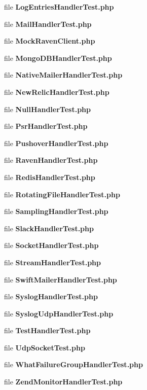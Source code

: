 \begin{DoxyCompactItemize}
file {\bf Log\+Entries\+Handler\+Test.\+php}
\item 
file {\bf Mail\+Handler\+Test.\+php}
\item 
file {\bf Mock\+Raven\+Client.\+php}
\item 
file {\bf Mongo\+D\+B\+Handler\+Test.\+php}
\item 
file {\bf Native\+Mailer\+Handler\+Test.\+php}
\item 
file {\bf New\+Relic\+Handler\+Test.\+php}
\item 
file {\bf Null\+Handler\+Test.\+php}
\item 
file {\bf Psr\+Handler\+Test.\+php}
\item 
file {\bf Pushover\+Handler\+Test.\+php}
\item 
file {\bf Raven\+Handler\+Test.\+php}
\item 
file {\bf Redis\+Handler\+Test.\+php}
\item 
file {\bf Rotating\+File\+Handler\+Test.\+php}
\item 
file {\bf Sampling\+Handler\+Test.\+php}
\item 
file {\bf Slack\+Handler\+Test.\+php}
\item 
file {\bf Socket\+Handler\+Test.\+php}
\item 
file {\bf Stream\+Handler\+Test.\+php}
\item 
file {\bf Swift\+Mailer\+Handler\+Test.\+php}
\item 
file {\bf Syslog\+Handler\+Test.\+php}
\item 
file {\bf Syslog\+Udp\+Handler\+Test.\+php}
\item 
file {\bf Test\+Handler\+Test.\+php}
\item 
file {\bf Udp\+Socket\+Test.\+php}
\item 
file {\bf What\+Failure\+Group\+Handler\+Test.\+php}
\item 
file {\bf Zend\+Monitor\+Handler\+Test.\+php}
\end{DoxyCompactItemize}
